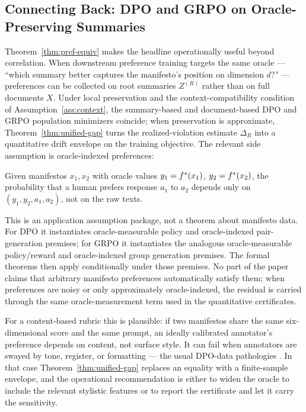 \subsection{Connecting Back: DPO and GRPO on Oracle-Preserving Summaries}

Theorem~\ref{thm:pref-equiv} makes the headline operationally useful
beyond correlation. When downstream preference training targets the
same oracle --- ``which summary better captures the manifesto's
position on dimension $d$?'' --- preferences can be collected on root
summaries $Z^{(R)}$ rather than on full documents $X$. Under local
preservation and the context-compatibility condition of
Assumption~\ref{ass:context}, the summary-based and
document-based DPO and GRPO population minimizers coincide; when
preservation is approximate, Theorem~\ref{thm:unified-gap} turns the
realized-violation estimate $\Delta_R$ into a quantitative drift
envelope on the training objective. The relevant side assumption is
oracle-indexed preferences:

\begin{assumption}\label{ass:pref}
Given manifestos $x_1, x_2$ with oracle values
$y_1 = f^\ast(x_1)$, $y_2 = f^\ast(x_2)$, the probability that a human
prefers response $a_1$ to $a_2$ depends only on $(y_1, y_2, a_1, a_2)$,
not on the raw texts.
\end{assumption}

This is an application assumption package, not a theorem about manifesto
data. For DPO it instantiates oracle-measurable policy and
oracle-indexed pair-generation premises; for GRPO it instantiates the
analogous oracle-measurable policy/reward and oracle-indexed group
generation premises. The formal theorems then apply conditionally under
those premises. No part of the paper claims that arbitrary manifesto
preferences automatically satisfy them; when preferences are noisy or only
approximately oracle-indexed, the residual is carried through the same
oracle-measurement term used in the quantitative certificates.

For a content-based rubric this is plausible: if two manifestos share
the same six-dimensional score and the same prompt, an ideally
calibrated annotator's preference depends on content, not surface
style. It can fail when annotators are swayed by tone, register, or
formatting --- the usual DPO-data pathologies \citep{RafailovEtAl2023DPO}.
In that case Theorem~\ref{thm:unified-gap} replaces an equality with a
finite-sample envelope, and the operational recommendation is either
to widen the oracle to include the relevant stylistic features or to
report the certificate and let it carry the sensitivity.

